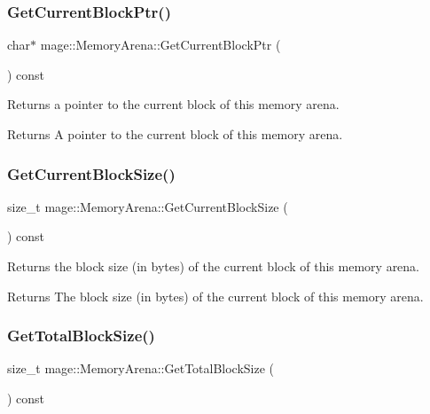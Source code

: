 \subsubsection{\texorpdfstring{Get\+Current\+Block\+Ptr()}{GetCurrentBlockPtr()}}
{\footnotesize\ttfamily char$\ast$ mage\+::\+Memory\+Arena\+::\+Get\+Current\+Block\+Ptr (\begin{DoxyParamCaption}{ }\end{DoxyParamCaption}) const}

Returns a pointer to the current block of this memory arena.

\begin{DoxyReturn}{Returns}
A pointer to the current block of this memory arena. 
\end{DoxyReturn}
\hypertarget{classmage_1_1_memory_arena_a2789bf0c58dee881662bbb0c5ba73e55}{}\label{classmage_1_1_memory_arena_a2789bf0c58dee881662bbb0c5ba73e55} 
\subsubsection{\texorpdfstring{Get\+Current\+Block\+Size()}{GetCurrentBlockSize()}}
{\footnotesize\ttfamily size\+\_\+t mage\+::\+Memory\+Arena\+::\+Get\+Current\+Block\+Size (\begin{DoxyParamCaption}{ }\end{DoxyParamCaption}) const}

Returns the block size (in bytes) of the current block of this memory arena.

\begin{DoxyReturn}{Returns}
The block size (in bytes) of the current block of this memory arena. 
\end{DoxyReturn}
\hypertarget{classmage_1_1_memory_arena_ac4be7fb4d5623d6f78b1576c7884883a}{}\label{classmage_1_1_memory_arena_ac4be7fb4d5623d6f78b1576c7884883a} 
\subsubsection{\texorpdfstring{Get\+Total\+Block\+Size()}{GetTotalBlockSize()}}
{\footnotesize\ttfamily size\+\_\+t mage\+::\+Memory\+Arena\+::\+Get\+Total\+Block\+Size (\begin{DoxyParamCaption}{ }\end{DoxyParamCaption}) const}

